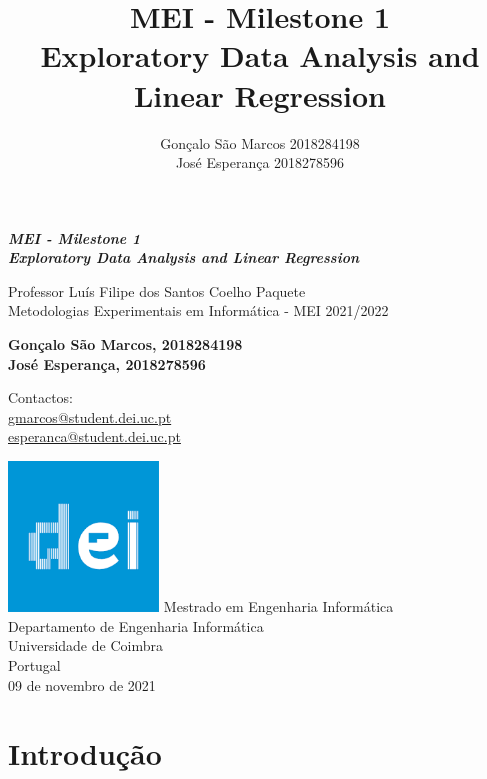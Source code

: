 \documentclass{article}
\title{MEI - Milestone 1\\Exploratory Data Analysis and Linear Regression}
\author{Gonçalo São Marcos 2018284198\\
        José Esperança 2018278596}
\begin{document}
\begin{titlepage}
   \begin{center}
       \vspace*{1cm}
    
        
    {\huge \textbf{\textit{MEI - Milestone 1\\Exploratory Data Analysis and Linear Regression}}}
       
        \vspace{0.7cm}

        Professor Luís Filipe dos Santos Coelho Paquete\\Metodologias Experimentais em Informática - MEI 2021/2022
            
        \vspace{0.7cm}
        \textbf{Gonçalo São Marcos, 2018284198\\
                José Esperança, 2018278596\\}

        \vspace{0.4cm}
        Contactos: \\
        \href{mailto:gmarcos.dei.uc.pt}{gmarcos@student.dei.uc.pt}\\
        \href{mailto:esperanca.dei.uc.pt}{esperanca@student.dei.uc.pt}
        
        \vspace{4.6cm}
        \includegraphics[width=0.3\textwidth]{dei.png}
        \vfill
        Mestrado em Engenharia Informática\\
       Departamento de Engenharia Informática\\
       Universidade de Coimbra\\
       Portugal\\
       09 de novembro de 2021
            
   \end{center}
\end{titlepage}


\pagebreak

\section{Introdução}
\end{document}

